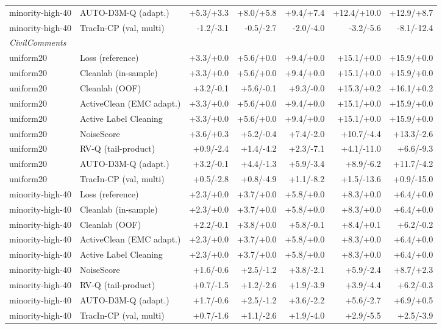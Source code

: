 \documentclass{article}
\begin{document}
\begin{table}[H]
{\begin{tabular}{llrrrrr}
minority-high-40 & AUTO-D3M-Q (adapt.) & +5.3/+3.3 & +8.0/+5.8 & +9.4/+7.4 & +12.4/+10.0 & +12.9/+8.7 \\
minority-high-40 & TracIn-CP (val, multi) & -1.2/-3.1 & -0.5/-2.7 & -2.0/-4.0 & -3.2/-5.6 & -8.1/-12.4 \\
\midrule
\multicolumn{6}{l}{\emph{CivilComments}} \\
uniform20 & Loss (reference) & +3.3/+0.0 & +5.6/+0.0 & +9.4/+0.0 & +15.1/+0.0 & +15.9/+0.0 \\
uniform20 & Cleanlab (in-sample) & +3.3/+0.0 & +5.6/+0.0 & +9.4/+0.0 & +15.1/+0.0 & +15.9/+0.0 \\
uniform20 & Cleanlab (OOF) & +3.2/-0.1 & +5.6/-0.1 & +9.3/-0.0 & +15.3/+0.2 & +16.1/+0.2 \\
uniform20 & ActiveClean (EMC adapt.) & +3.3/+0.0 & +5.6/+0.0 & +9.4/+0.0 & +15.1/+0.0 & +15.9/+0.0 \\
uniform20 & Active Label Cleaning & +3.3/+0.0 & +5.6/+0.0 & +9.4/+0.0 & +15.1/+0.0 & +15.9/+0.0 \\
uniform20 & NoiseScore & +3.6/+0.3 & +5.2/-0.4 & +7.4/-2.0 & +10.7/-4.4 & +13.3/-2.6 \\
uniform20 & RV-Q (tail-product) & +0.9/-2.4 & +1.4/-4.2 & +2.3/-7.1 & +4.1/-11.0 & +6.6/-9.3 \\
uniform20 & AUTO-D3M-Q (adapt.) & +3.2/-0.1 & +4.4/-1.3 & +5.9/-3.4 & +8.9/-6.2 & +11.7/-4.2 \\
uniform20 & TracIn-CP (val, multi) & +0.5/-2.8 & +0.8/-4.9 & +1.1/-8.2 & +1.5/-13.6 & +0.9/-15.0 \\
minority-high-40 & Loss (reference) & +2.3/+0.0 & +3.7/+0.0 & +5.8/+0.0 & +8.3/+0.0 & +6.4/+0.0 \\
minority-high-40 & Cleanlab (in-sample) & +2.3/+0.0 & +3.7/+0.0 & +5.8/+0.0 & +8.3/+0.0 & +6.4/+0.0 \\
minority-high-40 & Cleanlab (OOF) & +2.2/-0.1 & +3.8/+0.0 & +5.8/-0.1 & +8.4/+0.1 & +6.2/-0.2 \\
minority-high-40 & ActiveClean (EMC adapt.) & +2.3/+0.0 & +3.7/+0.0 & +5.8/+0.0 & +8.3/+0.0 & +6.4/+0.0 \\
minority-high-40 & Active Label Cleaning & +2.3/+0.0 & +3.7/+0.0 & +5.8/+0.0 & +8.3/+0.0 & +6.4/+0.0 \\
minority-high-40 & NoiseScore & +1.6/-0.6 & +2.5/-1.2 & +3.8/-2.1 & +5.9/-2.4 & +8.7/+2.3 \\
minority-high-40 & RV-Q (tail-product) & +0.7/-1.5 & +1.2/-2.6 & +1.9/-3.9 & +3.9/-4.4 & +6.2/-0.3 \\
minority-high-40 & AUTO-D3M-Q (adapt.) & +1.7/-0.6 & +2.5/-1.2 & +3.6/-2.2 & +5.6/-2.7 & +6.9/+0.5 \\
minority-high-40 & TracIn-CP (val, multi) & +0.7/-1.6 & +1.1/-2.6 & +1.9/-4.0 & +2.9/-5.5 & +2.5/-3.9 \\
\bottomrule
\end{tabular}}
\end{table}
\end{document}
